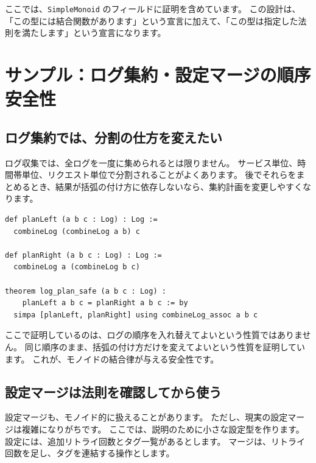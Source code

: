 ここでは、\texttt{SimpleMonoid} のフィールドに証明を含めています。
この設計は、「この型には結合関数があります」という宣言に加えて、「この型は指定した法則を満たします」という宣言になります。

\section{サンプル：ログ集約・設定マージの順序安全性}

\subsection{ログ集約では、分割の仕方を変えたい}

ログ収集では、全ログを一度に集められるとは限りません。
サービス単位、時間帯単位、リクエスト単位で分割されることがよくあります。
後でそれらをまとめるとき、結果が括弧の付け方に依存しないなら、集約計画を変更しやすくなります。

\begin{listing}[htbp]
\begin{verbatim}
def planLeft (a b c : Log) : Log :=
  combineLog (combineLog a b) c

def planRight (a b c : Log) : Log :=
  combineLog a (combineLog b c)

theorem log_plan_safe (a b c : Log) :
    planLeft a b c = planRight a b c := by
  simpa [planLeft, planRight] using combineLog_assoc a b c
\end{verbatim}
\caption{\texttt{log\_plan\_safe}}
\label{lst:ch16_log_plan}
\end{listing}

ここで証明しているのは、ログの順序を入れ替えてよいという性質ではありません。
同じ順序のまま、括弧の付け方だけを変えてよいという性質を証明しています。
これが、モノイドの結合律が与える安全性です。

\subsection{設定マージは法則を確認してから使う}

設定マージも、モノイド的に扱えることがあります。
ただし、現実の設定マージは複雑になりがちです。
ここでは、説明のために小さな設定型を作ります。
設定には、追加リトライ回数とタグ一覧があるとします。
マージは、リトライ回数を足し、タグを連結する操作とします。

